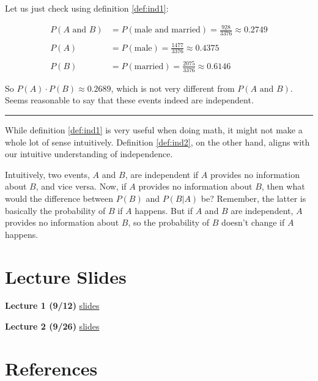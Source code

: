 \documentclass[]{book}
\theoremstyle{definition}
\theoremstyle{definition}
\theoremstyle{definition}
\theoremstyle{remark}
\begin{document}
Let us just check using definition \ref{def:ind1}:

\begin{align*}
  P(A \text{ and } B) &= P(\text{male and married}) = \frac{928}{3376} \approx 0.2749 \\
  & \\
  P(A) &= P(\text{male}) = \frac{1477}{3376} \approx 0.4375 \\
  & \\
  P(B) &= P(\text{married}) = \frac{2075}{3376} \approx 0.6146
\end{align*}

So \(P(A)\cdot P(B) \approx 0.2689\), which is not very different from \(P(A \text{ and } B)\). Seems reasonable to say that these events indeed are independent.

\begin{center}\rule{0.5\linewidth}{\linethickness}\end{center}

While definition \ref{def:ind1} is very useful when doing math, it might not make a whole lot of sense intuitively. Definition \ref{def:ind2}, on the other hand, aligns with our intuitive understanding of independence.

Intuitively, two events, \(A\) and \(B\), are independent if \(A\) provides no information about \(B\), and vice versa. Now, if \(A\) provides no information about \(B\), then what would the difference between \(P(B)\) and \(P(B|A)\) be? Remember, the latter is basically the probability of \(B\) if \(A\) happens. But if \(A\) and \(B\) are independent, \(A\) provides no information about \(B\), so the probability of \(B\) doesn't change if \(A\) happens.

\hypertarget{appendix-appendix}{%
\appendix}


\hypertarget{lecture-slides}{%
\chapter{Lecture Slides}\label{lecture-slides}}

\textbf{Lecture 1 (9/12)} \href{./lectures/lecture01/lec01_slides.html}{slides}

\textbf{Lecture 2 (9/26)} \href{./lectures/lecture02/lec02_slides.html}{slides}

\hypertarget{references}{%
\chapter*{References}\label{references}}


\end{document}
